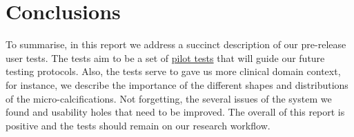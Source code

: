 
\section*{Conclusions}

To summarise, in this report we address a succinct description of our pre-release user tests. The tests aim to be a set of \hyperlink{https://www.nngroup.com/articles/pilot-testing/}{pilot tests} that will guide our future testing protocols. Also, the tests serve to gave us more clinical domain context, for instance, we describe the importance of the different shapes and distributions of the micro-calcifications. Not forgetting, the several issues of the system we found and usability holes that need to be improved. The overall of this report is positive and the tests should remain on our research workflow.